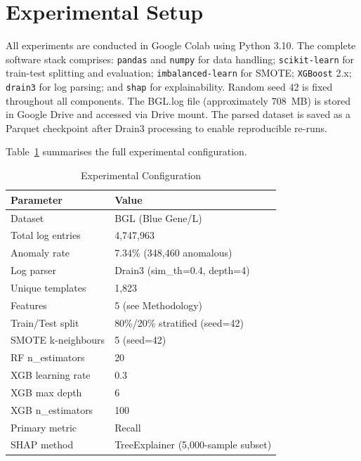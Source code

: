 \documentclass[conference]{IEEEtran}
\begin{document}
\section{Experimental Setup}
\label{sec:setup}

All experiments are conducted in Google Colab using Python 3.10. The
complete software stack comprises: \texttt{pandas} and \texttt{numpy} for
data handling; \texttt{scikit-learn} for train-test splitting and
evaluation; \texttt{imbalanced-learn} for SMOTE; \texttt{XGBoost} 2.x;
\texttt{drain3} for log parsing; and \texttt{shap} for explainability.
Random seed 42 is fixed throughout all components. The BGL.log file
(approximately 708~MB) is stored in Google Drive and accessed via Drive
mount. The parsed dataset is saved as a Parquet checkpoint after Drain3
processing to enable reproducible re-runs.

Table~\ref{tab:config} summarises the full experimental configuration.

\begin{table}[h]
\caption{Experimental Configuration}
\label{tab:config}
\centering
\small
\begin{tabular}{ll}
\toprule
\textbf{Parameter} & \textbf{Value} \\
\midrule
Dataset            & BGL (Blue Gene/L) \\
Total log entries  & 4{,}747{,}963 \\
Anomaly rate       & 7.34\% (348{,}460 anomalous) \\
Log parser         & Drain3 (sim\_th=0.4, depth=4) \\
Unique templates   & 1{,}823 \\
Features           & 5 (see Methodology) \\
Train/Test split   & 80\%/20\% stratified (seed=42) \\
SMOTE k-neighbours & 5 (seed=42) \\
RF n\_estimators   & 20 \\
XGB learning rate  & 0.3 \\
XGB max depth      & 6 \\
XGB n\_estimators  & 100 \\
Primary metric     & Recall \\
SHAP method        & TreeExplainer (5{,}000-sample subset) \\
\bottomrule
\end{tabular}
\end{table}
\end{document}
